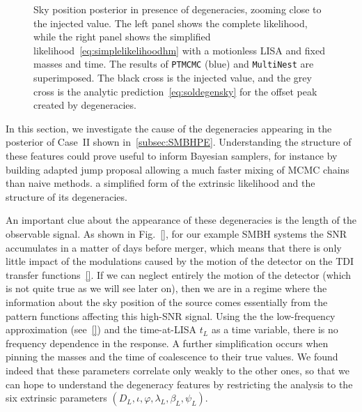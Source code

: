 \documentclass[aps,showpacs,twocolumn,prd,superscriptaddress,nofootinbib]{revtex4-1}
\newcommand\betaL{{\beta_{L}}}
\newcommand\lambdaL{{\lambda_{L}}}
\newcommand\psiL{{\psi_{L}}}
\begin{document}
\begin{figure}
\begin{minipage}{.49\linewidth}
  \end{minipage}
  \caption{Sky position posterior in presence of degeneracies, zooming close to the injected value. The left panel shows the complete likelihood, while the right panel shows the simplified likelihood~\eqref{eq:simplelikelihoodhm} with a motionless LISA and fixed masses and time. The results of \texttt{PTMCMC} (blue) and \texttt{MultiNest} are superimposed. The black cross is the injected value, and the grey cross is the analytic prediction~\eqref{eq:soldegensky} for the offset peak created by degeneracies.}
  \label{fig:Skydownsmbh22hmSimpleLikeCase9}
\end{figure}

In this section, we investigate the cause of the degeneracies appearing in the posterior of Case~II shown in~\ref{subsec:SMBHPE}. Understanding the structure of these features could prove useful to inform Bayesian samplers, for instance by building adapted jump proposal allowing a much faster mixing of MCMC chains than naive methods. a simplified form of the extrinsic likelihood and the structure of its degeneracies.

An important clue about the appearance of these degeneracies is the length of the observable signal. As shown in Fig.~\ref{}, for our example SMBH systems the SNR accumulates in a matter of days before merger, which means that there is only little impact of the modulations caused by the motion of the detector on the TDI transfer functions~\eqref{}. If we can neglect entirely the motion of the detector (which is not quite true as we will see later on), then we are in a regime where the information about the sky position of the source comes essentially from the pattern functions affecting this high-SNR signal. Using the the low-frequency approximation (see~\ref{}) and the time-at-LISA $t_{L}$ as a time variable, there is no frequency dependence in the response. A further simplification occurs when pinning the masses and the time of coalescence to their true values. We found indeed that these parameters correlate only weakly to the other ones, so that we can hope to understand the degeneracy features by restricting the analysis to the six extrinsic parameters $(D_{L}, \iota, \varphi, \lambdaL, \betaL, \psiL)$.
\end{document}
